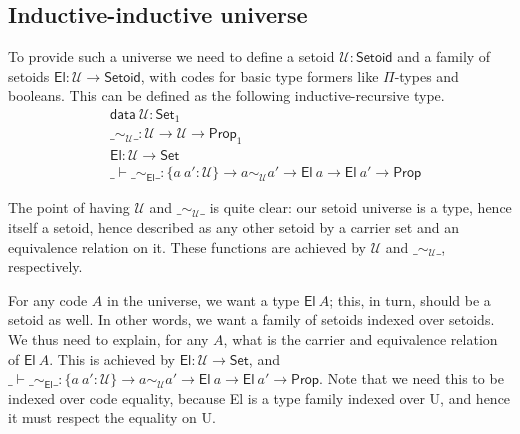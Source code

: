 \documentclass{easychair}
\newcommand{\setoidU}{\mathcal{U}}
\newcommand{\ad}[1]{\AgdaFunction{#1}}
\newcommand{\Set}{\textsf{Set}}
\newcommand{\Prop}{\textsf{Prop}}
\newcommand{\Setoid}{\textsf{Setoid}}
\newcommand{\U}{\textsf{U}}
\newcommand{\El}{\textsf{El}}
\providecommand\mathbbm{\mathbb}
\begin{document}


\subsection{Inductive-inductive universe}

To provide such a universe we need to define a setoid $\setoidU : \Setoid$ and a
family of setoids $\El : \setoidU \to \Setoid$, with codes for basic type
formers like $\Pi$-types and booleans. This can be defined as the following
inductive-recursive type. 
%
\begin{align*}
  & \textsf{data} \ \setoidU : \Set_1 \\
  & \_\sim_\setoidU\_ : \setoidU \to \setoidU \to \Prop_1 \\
  & \El : \setoidU \to \Set \\
  & \_\vdash\_\sim_\El\_ : \{a\ a' : \setoidU\} \to a \sim_\setoidU a' \to \El\ a \to \El\ a' \to \Prop
\end{align*}

The point of having $\setoidU$ and $\_\sim_\setoidU\_$ is quite clear: our
setoid universe is a type, hence itself a setoid, hence described as any other
setoid by a carrier set and an equivalence relation on it. These functions are
achieved by $\setoidU$ and $\_\sim_{\setoidU}\_$, respectively.

For any code $A$ in the universe, we want a type $\El\ A$; this, in turn, should
be a setoid as well. In other words, we want a family of setoids indexed over
setoids. We thus need to explain, for any $A$, what is the carrier and
equivalence relation of $\El\ A$. This is achieved by $\El : \setoidU \to \Set$,
and $\_\vdash\_\sim_\El\_ : \{a\ a' : \setoidU\} \to a \sim_\setoidU a' \to
\El\ a \to \El\ a' \to \Prop$. Note that we need this to be indexed over code
equality, because El is a type family indexed over U, and hence it must respect
the equality on U. 
\end{document}
